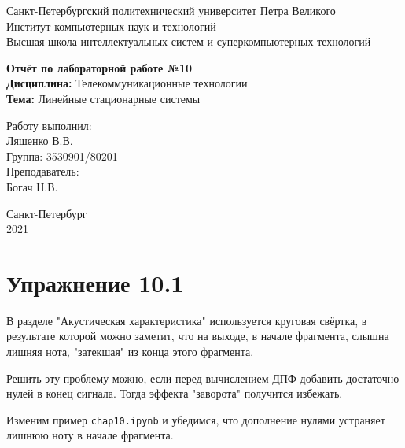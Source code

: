 \documentclass[a4paper,12pt]{report}
\begin{document}
 

\begin{titlepage}
\newpage
	\begin{center}
		\large Санкт-Петербургский политехнический университет Петра Великого\\
		Институт компьютерных наук и технологий\\
		Высшая школа интеллектуальных систем и суперкомпьютерных технологий\\
	\end{center}
\vspace{7cm}

\begin{center}
		\large \textbf{Отчёт по лабораторной работе №10} \\
		\textbf{Дисциплина:} Телекоммуникационные технологии\\
		\textbf{Тема:} Линейные стационарные системы
\end{center}
\vspace{4cm}
	
\begin{flushright}
		\large Работу выполнил:\\ Ляшенко В.В.\\
		Группа: 3530901/80201\\
		Преподаватель:\\ Богач Н.В.
\end{flushright}

\vspace{\fill}
\begin{center}
	\large Санкт-Петербург\\ 2021
	\end{center}
\end{titlepage}

\tableofcontents
\listoffigures
\lstlistoflistings

\chapter{Упражнение 10.1}
    В разделе "Акустическая характеристика" используется круговая свёртка, в результате которой можно заметит, что на выходе, в начале фрагмента, слышна лишняя нота, "затекшая" из конца этого фрагмента. 
    
    Решить эту проблему можно, если перед вычислением ДПФ добавить достаточно нулей в конец сигнала. Тогда эффекта "заворота" получится избежать.
    
    Изменим пример \texttt{chap10.ipynb} и убедимся, что дополнение нулями устраняет лишнюю ноту в начале фрагмента.
    
\end{document}
